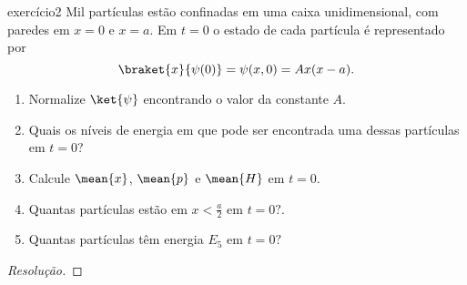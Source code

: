 \begin{exercício}{}{exercício2}
    Mil partículas estão confinadas em uma caixa unidimensional, com paredes em \(x = 0\) e \(x = a\). Em \(t = 0\) o estado de cada partícula é representado por
    \begin{equation*}
        \braket{x}{\psi(0)} = \psi(x,0) = A x(x-a).
    \end{equation*}
    \begin{enumerate}[label=(\alph*)]
        \item Normalize \(\ket{\psi}\) encontrando o valor da constante \(A\).
        \item Quais os níveis de energia em que pode ser encontrada uma dessas partículas em \(t = 0\)?
        \item Calcule \(\mean{x}\), \(\mean{p}\) e \(\mean{H}\) em \(t = 0\).
        \item Quantas partículas estão em \(x < \frac{a}2\) em \(t = 0?\).
        \item Quantas partículas têm energia \(E_5\) em \(t = 0?\)
    \end{enumerate}
\end{exercício}
\begin{proof}[Resolução]

\end{proof}

